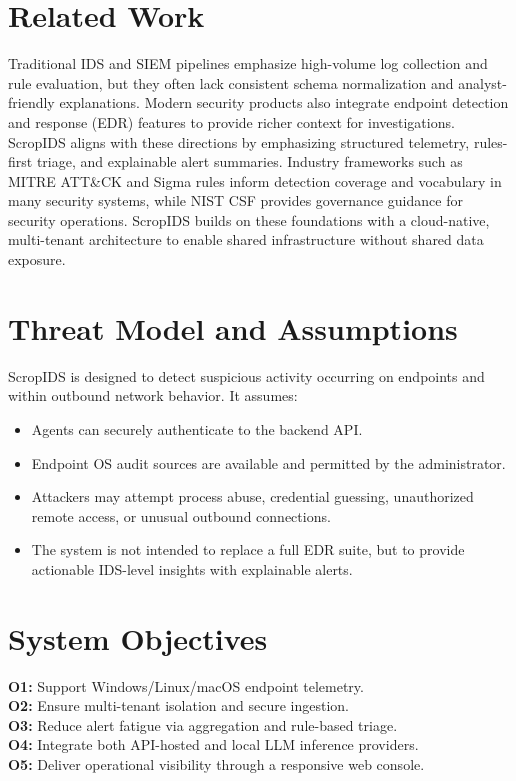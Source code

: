 \documentclass[conference]{IEEEtran}
\begin{document}
\section{Related Work}
Traditional IDS and SIEM pipelines emphasize high-volume log collection and rule evaluation, but they often lack consistent schema normalization and analyst-friendly explanations. Modern security products also integrate endpoint detection and response (EDR) features to provide richer context for investigations. ScropIDS aligns with these directions by emphasizing structured telemetry, rules-first triage, and explainable alert summaries. Industry frameworks such as MITRE ATT\&CK and Sigma rules inform detection coverage and vocabulary in many security systems, while NIST CSF provides governance guidance for security operations. ScropIDS builds on these foundations with a cloud-native, multi-tenant architecture to enable shared infrastructure without shared data exposure.

\section{Threat Model and Assumptions}
ScropIDS is designed to detect suspicious activity occurring on endpoints and within outbound network behavior. It assumes:
\begin{itemize}[leftmargin=1.2em]
    \item Agents can securely authenticate to the backend API.
    \item Endpoint OS audit sources are available and permitted by the administrator.
    \item Attackers may attempt process abuse, credential guessing, unauthorized remote access, or unusual outbound connections.
    \item The system is not intended to replace a full EDR suite, but to provide actionable IDS-level insights with explainable alerts.
\end{itemize}

\section{System Objectives}
\textbf{O1:} Support Windows/Linux/macOS endpoint telemetry. \\
\textbf{O2:} Ensure multi-tenant isolation and secure ingestion. \\
\textbf{O3:} Reduce alert fatigue via aggregation and rule-based triage. \\
\textbf{O4:} Integrate both API-hosted and local LLM inference providers. \\
\textbf{O5:} Deliver operational visibility through a responsive web console.
\end{document}

